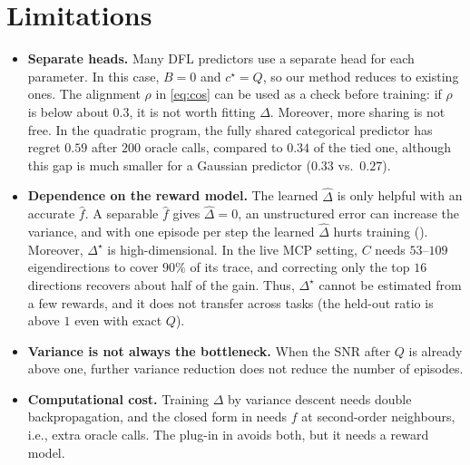 \documentclass[10pt]{article}
\theoremstyle{plain}
\theoremstyle{definition}
\theoremstyle{remark}
\theoremstyle{definition}
\newcommand{\Dstar}{\Delta^{\star}}
\newcommand{\cstar}{c^{\star}}
\begin{document}
\section{Limitations}\label{sec:limitations}
\begin{itemize}
    \item \textbf{Separate heads.} Many DFL predictors use a separate head for each parameter. In this case, $B=0$ and $\cstar=Q$, so our method reduces to existing ones. The alignment $\rho$ in \eqref{eq:cos} can be used as a check before training: if $\rho$ is below about $0.3$, it is not worth fitting $\Delta$. Moreover, more sharing is not free. In the quadratic program, the fully shared categorical predictor has regret $0.59$ after $200$ oracle calls, compared to $0.34$ of the tied one, although this gap is much smaller for a Gaussian predictor ($0.33$ vs.\ $0.27$).
    \item \textbf{Dependence on the reward model.} The learned $\hat\Delta$ is only helpful with an accurate $\hat f$. A separable $\hat f$ gives $\hat\Delta=0$, an unstructured error can increase the variance, and with one episode per step the learned $\hat\Delta$ hurts training (). Moreover, $\Dstar$ is high-dimensional. In the live MCP setting, $C$ needs $53$--$109$ eigendirections to cover $90\%$ of its trace, and correcting only the top $16$ directions recovers about half of the gain. Thus, $\Dstar$ cannot be estimated from a few rewards, and it does not transfer across tasks (the held-out ratio is above $1$ even with exact $Q$).
    \item \textbf{Variance is not always the bottleneck.} When the SNR after $Q$ is already above one, further variance reduction does not reduce the number of episodes.
    \item \textbf{Computational cost.} Training $\Delta$ by variance descent needs double backpropagation, and the closed form in  needs $f$ at second-order neighbours, i.e., extra oracle calls. The plug-in in  avoids both, but it needs a reward model.
\end{itemize}
\end{document}
